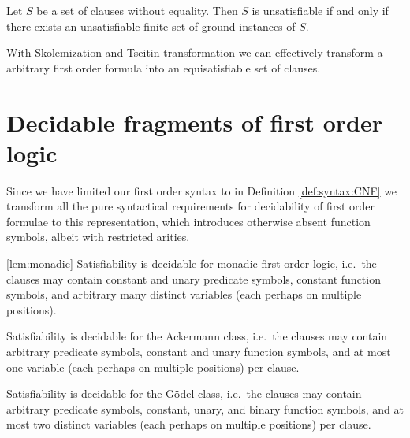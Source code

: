 \begin{corollary}
	Let $S$ be a set of clauses without equality. 
	Then $S$ is unsatisfiable if and only if there exists 
	an unsatisfiable finite set of ground instances of $S$.
\end{corollary}

\begin{lemma}
With Skolemization and Tseitin transformation we can effectively transform a arbitrary first order formula into an equisatisfiable set of clauses.	
\end{lemma}



\section{Decidable fragments of first order logic}

Since we have limited our first order syntax to \CNF in Definition \vref{def:syntax:CNF} 
we transform all the pure syntactical requirements for decidability of first order formulae 
to this representation, which introduces otherwise absent function symbols, albeit with restricted arities.


\begin{lemma}\ref{lem:monadic}
	Satisfiability is decidable for monadic first order logic, 
	i.e.~the clauses 
	may contain constant and unary predicate symbols, 
	constant function symbols,
	and arbitrary many distinct variables 
	(each perhaps on multiple positions).
\end{lemma}


\begin{lemma}\label{lem:ackermann}
	Satisfiability is decidable for the Ackermann class, 
	i.e.~the clauses
	may contain arbitrary predicate symbols, 
	constant and unary function symbols, 
	and at most one variable 
	(each perhaps on multiple positions) per clause.
\end{lemma}


\begin{lemma}\label{lem:goedel}
	Satisfiability is decidable for the Gödel class, 
	i.e.~the clauses
	may contain arbitrary predicate symbols, 
	constant, unary, and binary function symbols, 
	and at most two distinct variables 
	(each perhaps on multiple positions) per clause.
	
\end{lemma}


